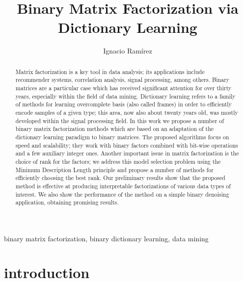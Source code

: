 \documentclass[twocolumn]{IEEEtran}
\title{Binary Matrix Factorization via Dictionary Learning}\author{Ignacio Ram\'{i}rez}
\theoremstyle{definition}
\begin{document}
%
\maketitle
%
\begin{abstract}
Matrix factorization is a key tool in data analysis; its applications include recommender systems, correlation analysis, signal processing, among others. Binary matrices are a particular case which has received significant attention for over thirty years, especially within the field of data mining. Dictionary learning refers to a family of methods for learning overcomplete basis (also called frames) in order to efficiently encode samples of a given type; this area, now also about twenty years old, was mostly developed within the signal processing field.
In this work we propose a number of binary matrix factorization methods which are based on an adaptation of the dictionary learning paradigm to binary matrices.
The proposed algorithms focus on speed and scalability; they work with binary factors combined with bit-wise operations and a few auxiliary integer ones.
Another important issue in matrix factorization is the choice of rank for the factors; we address this model selection problem using the Minimum Description Length principle and propose a number of methods for efficiently choosing the best rank.
Our preliminary results show that the proposed method is effective at producing interpretable factorizations of various data types of interest. We also show the performance of the method on a simple binary denoising application, obtaining promising results.
\end{abstract}%
\begin{IEEEkeywords}
binary matrix factorization, binary dictionary learning, data mining
\end{IEEEkeywords}
%
\section{introduction}
\end{document}
